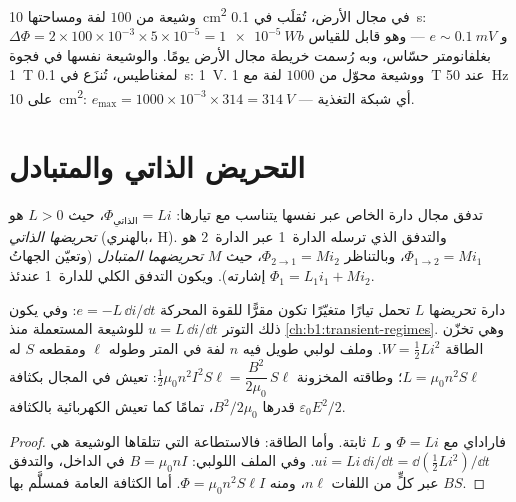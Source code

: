 \begin{example}\label{ex:b1:induction:orders}
وشيعة من $100$ لفة ومساحتها \qty{10}{cm^2} في مجال الأرض، تُقلَب في
\qty{0.1}{s}: $\Delta\Phi = 2 \times 100 \times 10^{-3} \times 5 \times 10^{-5} = \qty{1e-5}{Wb}$
و $e \sim \qty{0.1}{mV}$ --- وهو قابل للقياس بغلفانومتر حسّاس، وبه
رُسمت خريطة مجال الأرض يومًا. والوشيعة نفسها في فجوة \qty{1}{T}
لمغناطيس، تُنزَع في \qty{0.1}{s}: \qty{1}{V}. ووشيعة محوّل من
$1000$ لفة مع \qty{1}{T} عند \qty{50}{Hz} على \qty{10}{cm^2}: $e_{\max} =
1000 \times 10^{-3} \times 314 = \qty{314}{V}$ --- أي شبكة التغذية.
\end{example}

\section{التحريض الذاتي والمتبادل}

\begin{definition}[التحريض]\label{def:b1:induction:inductance}
تدفق مجال دارة الخاص عبر نفسها يتناسب مع
تيارها: $\Phi_{\text{الذاتي}} = Li$، حيث $L > 0$ هو \emph{تحريضها الذاتي}
(بالهنري، \unit{H}). والتدفق الذي ترسله الدارة~1 عبر الدارة~2 هو
$\Phi_{1 \to 2} = Mi_1$، وبالتناظر $\Phi_{2 \to 1} = Mi_2$، حيث $M$
\emph{تحريضهما المتبادل} (وتعيّن الجهاتُ إشارته). ويكون
التدفق الكلي للدارة~1 عندئذ $\Phi_1 = L_1i_1 + Mi_2$.
\end{definition}

\begin{proposition}\label{prop:b1:induction:inductor}
دارة تحريضها $L$ تحمل تيارًا متغيّرًا تكون مقرًّا
للقوة المحركة $e = -L\,\dd i/\dd t$: وفي  يكون ذلك
التوتر $u = L\,\dd i/\dd t$ للوشيعة المستعملة منذ
\cref{ch:b1:transient-regimes}. وهي تخزّن الطاقة $W = \tfrac12Li^2$.
وملف لولبي طويل فيه $n$ لفة في المتر وطوله $\ell$ ومقطعه $S$
له $L = \mu_0n^2S\ell$؛ وطاقته المخزونة $\tfrac12\mu_0n^2I^2S\ell =
\dfrac{B^2}{2\mu_0}\,S\ell$:  تعيش في المجال بكثافة
قدرها $B^2/2\mu_0$، تمامًا كما تعيش الكهربائية بالكثافة $\varepsilon_0E^2/2$.
\end{proposition}

\begin{proof}
فاراداي مع $\Phi = Li$ و $L$ ثابتة. وأما الطاقة: فالاستطاعة التي تتلقاها
الوشيعة هي $ui = Li\,\dd i/\dd t = \dd(\tfrac12Li^2)/\dd t$. وفي الملف اللولبي:
$B = \mu_0nI$ في الداخل، والتدفق $BS$ عبر كلٍّ من اللفات $n\ell$، ومنه $\Phi =
\mu_0n^2S\ell I$. أما الكثافة العامة فمسلَّم بها.
\end{proof}

